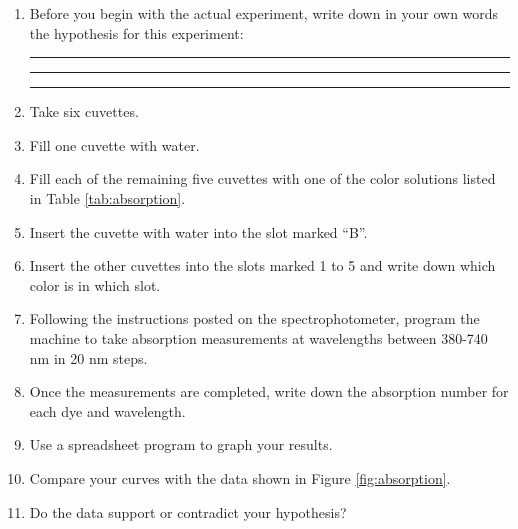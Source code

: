 \documentclass[]{book}
\begin{document}
\begin{enumerate}
\def\labelenumi{\arabic{enumi}.}
\item
  Before you begin with the actual experiment, write down in your own words the hypothesis for this experiment:

  \begin{center}\rule{0.5\linewidth}{\linethickness}\end{center}

  \begin{center}\rule{0.5\linewidth}{\linethickness}\end{center}

  \begin{center}\rule{0.5\linewidth}{\linethickness}\end{center}
\item
  Take six cuvettes.
\item
  Fill one cuvette with water.
\item
  Fill each of the remaining five cuvettes with one of the color solutions listed in Table \ref{tab:absorption}.
\item
  Insert the cuvette with water into the slot marked ``B''.
\item
  Insert the other cuvettes into the slots marked 1 to 5 and write down which color is in which slot.
\item
  Following the instructions posted on the spectrophotometer, program the machine to take absorption measurements at wavelengths between 380-740 nm in 20 nm steps.
\item
  Once the measurements are completed, write down the absorption number for each dye and wavelength.
\item
  Use a spreadsheet program to graph your results.
\item
  Compare your curves with the data shown in Figure \ref{fig:absorption}.
\item
  Do the data support or contradict your hypothesis?
\end{enumerate}
\end{document}
